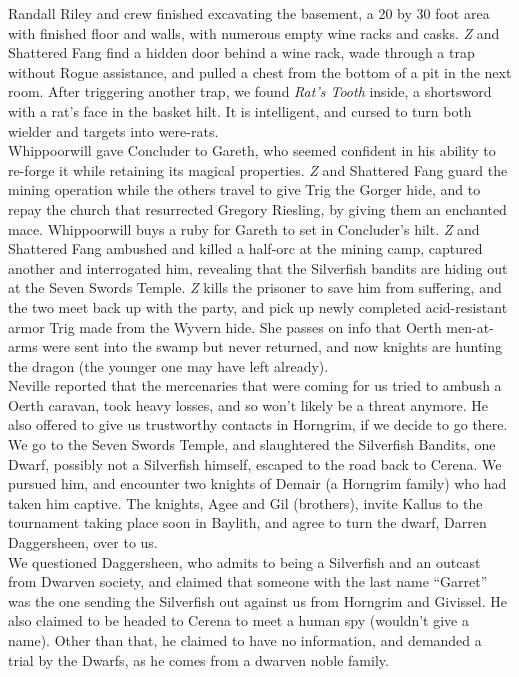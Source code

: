\documentclass[letterpaper]{article}
\begin{document}
\noindent Randall Riley and crew finished excavating the basement, a 20 by 30 foot area with finished floor and walls, with numerous empty wine racks and casks.  \emph{Z} and Shattered Fang find a hidden door behind a wine rack, wade through a trap without Rogue assistance, and pulled a chest from the bottom of a pit in the next room.  After triggering another trap, we found \emph{Rat's Tooth} inside, a shortsword with a rat's face in the basket hilt.  It is intelligent, and cursed to turn both wielder and targets into were-rats.  \\

\noindent Whippoorwill gave Concluder to Gareth, who seemed confident in his ability to re-forge it while retaining its magical properties. \emph{Z} and Shattered Fang guard the mining operation while the others travel to give Trig the Gorger hide, and to repay the church that resurrected Gregory Riesling, by giving them an enchanted mace. Whippoorwill buys a ruby for Gareth to set in Concluder's hilt. \emph{Z} and Shattered Fang ambushed and killed a half-orc at the mining camp, captured another and interrogated him, revealing that the Silverfish bandits are hiding out at the Seven Swords Temple. \emph{Z} kills the prisoner to save him from suffering, and the two meet back up with the party, and pick up newly completed acid-resistant armor Trig made from the Wyvern hide.  She passes on info that Oerth men-at-arms were sent into the swamp but never returned, and now knights are hunting the dragon (the younger one may have left already).\\

\noindent Neville reported that the mercenaries that were coming for us tried to ambush a Oerth caravan, took heavy losses, and so won't likely be a threat anymore.  He also offered to give us trustworthy contacts in Horngrim, if we decide to go there.\\

\noindent We go to the Seven Swords Temple, and slaughtered the Silverfish Bandits, one Dwarf, possibly not a Silverfish himself, escaped to the road back to Cerena. We pursued him, and encounter two knights of Demair (a Horngrim family) who had taken him captive. The knights, Agee and Gil (brothers), invite Kallus to the tournament taking place soon in Baylith, and agree to turn the dwarf, Darren Daggersheen, over to us.\\

\noindent We questioned Daggersheen, who admits to being a Silverfish and an outcast from Dwarven society, and claimed that someone with the last name ``Garret'' was the one sending the Silverfish out against us from Horngrim and Givissel. He also claimed to be headed to Cerena to meet a human spy (wouldn't give a name).  Other than that, he claimed to have no information, and demanded a trial by the Dwarfs, as he comes from a dwarven noble family.\\
\end{document}
